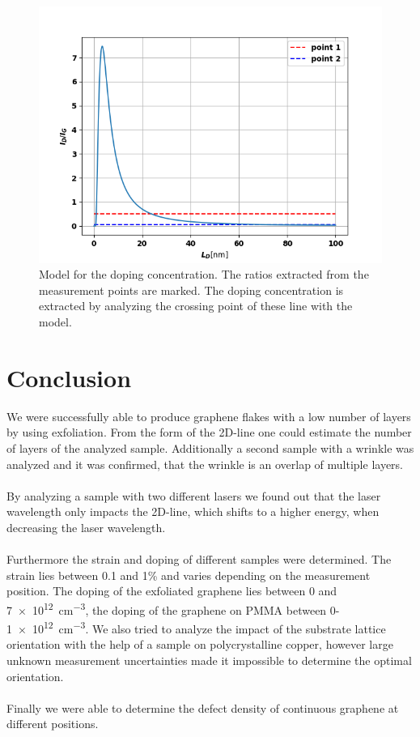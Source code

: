 \documentclass[12pt,a4paper]{article}
\begin{document}
\begin{figure}[!htb]
\centering
\includegraphics[scale=0.7]{Bilder/part7/fit.png}
\caption{Model for the doping concentration. The ratios extracted from the measurement points are marked. The doping concentration is extracted by analyzing the crossing point of these line with the model.}
\label{fig:part7_fit}
\end{figure}


\newpage
\section{Conclusion}
We were successfully able to produce graphene flakes with a low number of layers by using exfoliation. From the form of the 2D-line one could estimate the number of layers of the analyzed sample. Additionally a second sample with a wrinkle was analyzed and it was confirmed, that the wrinkle is an overlap of multiple layers.\\
\\
By analyzing a sample with two different lasers we found out that the laser wavelength only impacts the 2D-line, which shifts to a higher energy, when decreasing the laser wavelength.\\
\\
Furthermore the strain and doping of different samples were determined. The strain lies between 0.1 and 1\% and varies depending on the measurement position. The doping of the exfoliated graphene lies between 0 and \SI{7e12}{cm^{-3}}, the doping of the graphene on PMMA between 0-\SI{1e12}{cm^{-3}}. We also tried to analyze the impact of the substrate lattice orientation with the help of a sample on polycrystalline copper, however large unknown measurement uncertainties made it impossible to determine the optimal orientation.\\
\\
Finally we were able to determine the defect density of continuous graphene at different positions. 
\end{document}
